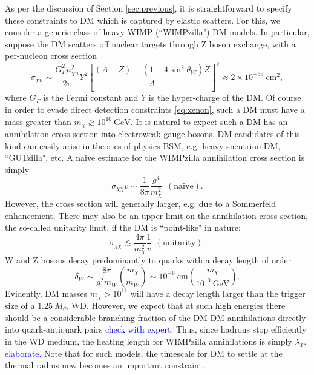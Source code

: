 \documentclass[preprintnumbers,amsmath,amssymb,prd,superscriptaddress]{revtex4}
\newcommand{\GeV}{\text{GeV}}
\newcommand{\cm}{\text{cm}}
\def\r{\right)}
\def\l{\left(}
\begin{document}
As per the discussion of Section \ref{sec:previous}, it is straightforward to specify these constraints to DM which is captured by elastic scatters. 
For this, we consider a generic class of heavy WIMP (``WIMPzilla") DM models. 
In particular, suppose the DM scatters off nuclear targets through Z boson exchange, with a per-nucleon cross section
\begin{equation}
\label{eq:Zscattering}
\sigma_{\chi n} \sim \frac{G_F^2 \mu_{\chi n}^2}{2\pi} Y^2 \left [\frac{(A-Z) - (1-4 \sin^2{\theta_W})Z}{A} \right ]^2 \approx 2 \times 10^{-39} ~\cm^2,
\end{equation}
where $G_F$ is the Fermi constant and $Y$ is the hyper-charge of the DM. 
Of course in order to evade direct detection constraints \eqref{eq:xenon}, such a DM must have a mass greater than $m_\chi \gtrsim 10^{10} ~\GeV$. 
It is natural to expect such a DM has an annihilation cross section into electroweak gauge bosons.
DM candidates of this kind can easily arise in theories of physics BSM, e.g. heavy sneutrino DM, ``GUTzilla", etc. 
A naive estimate for the WIMPzilla annihilation cross section is simply
\begin{equation}
\sigma_{\chi \chi} v \sim \frac{1}{8\pi} \frac{g^4}{m_\chi^2} ~~ (\text{naive}).
\end{equation}
However, the cross section will generally larger, e.g. due to a Sommerfeld enhancement. 
There may also be an upper limit on the annihilation cross section, the so-called unitarity limit, if the DM is ``point-like" in nature:
\begin{equation}
\sigma_{\chi \chi} \lesssim \frac{4 \pi}{m_\chi^2} \frac{1}{v} ~~ (\text{unitarity}).
\end{equation}
W and Z bosons decay predominantly to quarks with a decay length of order
\begin{equation}
\delta_W \sim \frac{8\pi}{g^2 m_W} \l \frac{m_\chi}{m_W} \r \sim 10^{-6} ~\cm \l \frac{m_\chi}{10^{10} ~\GeV} \r. 
\end{equation}
Evidently, DM masses $m_\chi > 10^{11}$ will have a decay length larger than the trigger size of a $1.25~M_{\astrosun}$ WD.
However, we expect that at such high energies there should be a considerable branching fraction of the DM-DM annihilations directly into quark-antiquark pairs \textcolor{blue}{check with expert}. 
Thus, since hadrons stop efficiently in the WD medium, the heating length for WIMPzilla annihilations is simply $\lambda_T$. 
\textcolor{blue}{elaborate.}
Note that for such models, the timescale for DM to settle at the thermal radius now becomes an important constraint. 
\end{document}
